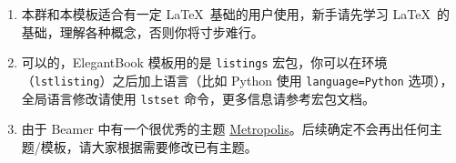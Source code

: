 \begin{enumerate}[itemsep=1.5ex]
  \item {}
    本群和本模板适合有一定 \LaTeX\ 基础的用户使用，新手请先学习 \LaTeX\ 的基础，理解各种概念，否则你将寸步难行。
  \item {}
    可以的，ElegantBook 模板用的是 \lstinline{listings} 宏包，你可以在环境（\lstinline{lstlisting}）之后加上语言（比如 Python 使用 \lstinline{language=Python} 选项），全局语言修改请使用 \lstinline{lstset} 命令，更多信息请参考宏包文档。
  \item {}
    由于 Beamer 中有一个很优秀的主题 \href{https://github.com/matze/mtheme}{Metropolis}。后续确定不会再出任何主题/模板，请大家根据需要修改已有主题。
\end{enumerate}

